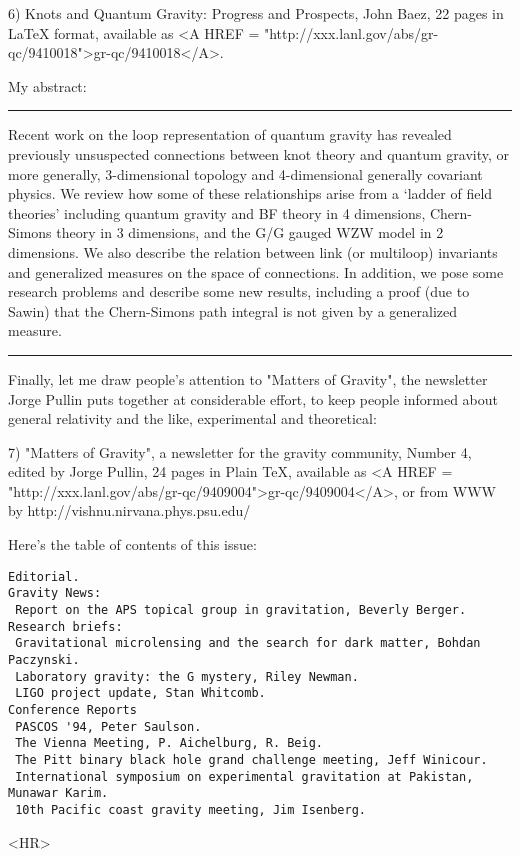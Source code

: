 6) Knots and Quantum Gravity: Progress and Prospects, John Baez, 22
pages in LaTeX format, available as <A HREF = "http://xxx.lanl.gov/abs/gr-qc/9410018">gr-qc/9410018</A>.

My abstract:

\par\noindent\rule{\textwidth}{0.4pt}
Recent work on the loop representation of quantum gravity has revealed
previously unsuspected connections between knot theory and quantum
gravity, or more generally, 3-dimensional topology and 4-dimensional
generally covariant physics.  We review how some of these relationships
arise from a `ladder of field theories' including quantum gravity and BF
theory in 4 dimensions, Chern-Simons theory in 3 dimensions, and the G/G
gauged WZW model in 2 dimensions.  We also describe the relation between
link (or multiloop) invariants and generalized measures on the space of
connections.  In addition, we pose some research problems and describe
some new results, including a proof (due to Sawin) that the Chern-Simons
path integral is not given by a generalized measure.
\par\noindent\rule{\textwidth}{0.4pt}

Finally, let me draw people's attention to "Matters of Gravity", the 
newsletter Jorge Pullin puts together at considerable effort, to keep
people informed about general relativity and the like, experimental and
theoretical:

7) "Matters of Gravity", a newsletter for the gravity community, Number
4, edited by Jorge Pullin, 24 pages in Plain TeX, available as
<A HREF = "http://xxx.lanl.gov/abs/gr-qc/9409004">gr-qc/9409004</A>, or from WWW by http://vishnu.nirvana.phys.psu.edu/ 

Here's the table of contents of this issue:

\begin{verbatim}
Editorial.
Gravity News:
 Report on the APS topical group in gravitation, Beverly Berger.
Research briefs:
 Gravitational microlensing and the search for dark matter, Bohdan Paczynski.
 Laboratory gravity: the G mystery, Riley Newman.
 LIGO project update, Stan Whitcomb.
Conference Reports
 PASCOS '94, Peter Saulson.
 The Vienna Meeting, P. Aichelburg, R. Beig.
 The Pitt binary black hole grand challenge meeting, Jeff Winicour.
 International symposium on experimental gravitation at Pakistan, 
Munawar Karim.
 10th Pacific coast gravity meeting, Jim Isenberg.
\end{verbatim}
    
<HR>



